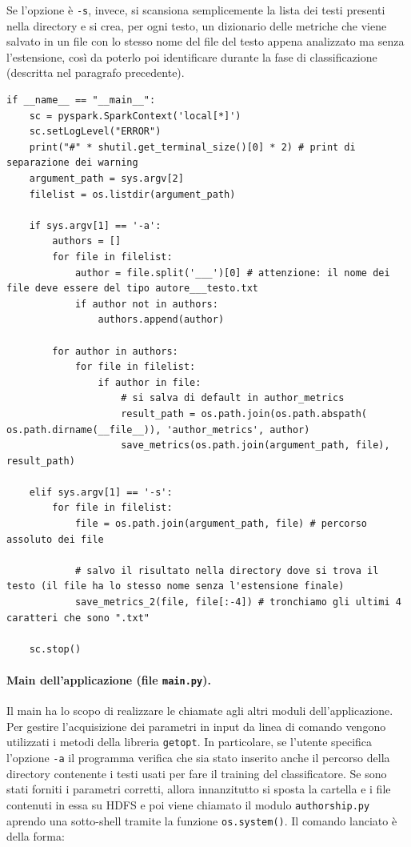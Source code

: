\documentclass[titlepage]{article}
\begin{document}
Se l'opzione è \texttt{-s}, invece, si scansiona semplicemente la lista dei testi presenti nella directory e si crea, per ogni testo, un dizionario delle metriche che viene salvato in un file con lo stesso nome del file del testo appena analizzato ma senza l'estensione, così da poterlo poi identificare durante la fase di classificazione (descritta nel paragrafo precedente).

\begin{verbatim}
if __name__ == "__main__":
    sc = pyspark.SparkContext('local[*]')
    sc.setLogLevel("ERROR")
    print("#" * shutil.get_terminal_size()[0] * 2) # print di separazione dei warning
    argument_path = sys.argv[2]
    filelist = os.listdir(argument_path)
    
    if sys.argv[1] == '-a':
        authors = []
        for file in filelist:
            author = file.split('___')[0] # attenzione: il nome dei file deve essere del tipo autore___testo.txt
            if author not in authors:
                authors.append(author)

        for author in authors:
            for file in filelist:
                if author in file:
                    # si salva di default in author_metrics
                    result_path = os.path.join(os.path.abspath( os.path.dirname(__file__)), 'author_metrics', author)
                    save_metrics(os.path.join(argument_path, file), result_path)

    elif sys.argv[1] == '-s':
        for file in filelist:
            file = os.path.join(argument_path, file) # percorso assoluto dei file
            
            # salvo il risultato nella directory dove si trova il testo (il file ha lo stesso nome senza l'estensione finale)
            save_metrics_2(file, file[:-4]) # tronchiamo gli ultimi 4 caratteri che sono ".txt"

    sc.stop()
\end{verbatim}

\paragraph{Main dell'applicazione (file \texttt{main.py}).}
Il main ha lo scopo di realizzare le chiamate agli altri moduli dell'applicazione. Per gestire l'acquisizione dei parametri in input da linea di comando vengono utilizzati i metodi della libreria \texttt{getopt}. In particolare, se l'utente specifica l'opzione \texttt{-a} il programma verifica che sia stato inserito anche il percorso della directory contenente i testi usati per fare il training del classificatore. Se sono stati forniti i parametri corretti, allora innanzitutto si sposta la cartella e i file contenuti in essa su HDFS e poi viene chiamato il modulo \texttt{authorship.py} aprendo una sotto-shell tramite la funzione \texttt{os.system()}. Il comando lanciato è della forma:
\bigskip
\end{document}
